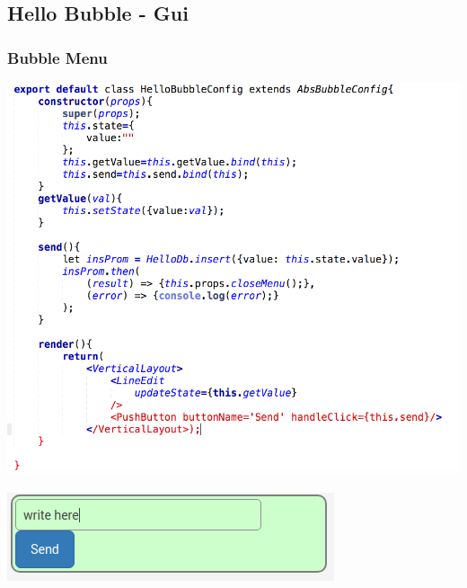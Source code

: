 \subsection{Hello Bubble - Gui}
\begin{frame}[fragile]
  \frametitle{Bubble Menu}
  \begin{minipage}{.65\textwidth}
      \includegraphics[width=\textwidth]{code/hellobubbleconfig.png}
  \end{minipage}
  \begin{minipage}{.34\textwidth}
      \includegraphics[width=\textwidth]{code/config.png}
  \end{minipage}
\end{frame}

